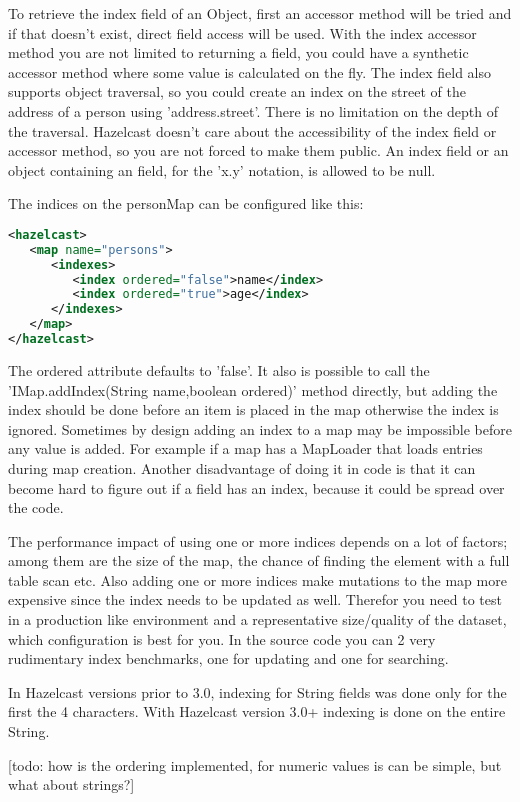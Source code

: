 To retrieve the index field of an Object, first an accessor method will be tried and if that doesn't exist, direct field access will be used. With the index accessor method you are not limited to returning a field, you could have a synthetic accessor method where some value is calculated on the fly. The index field also supports object traversal, so you could create an index on the street of the address of a person using 'address.street'. There is no limitation on the depth of the traversal. Hazelcast doesn't care about the accessibility of the index field or accessor method, so you are not forced to make them public. An index field or an object containing an field, for the 'x.y' notation, is allowed to be null.

The indices on the personMap can be configured like this:
\begin{lstlisting}[language=xml]
<hazelcast>
   <map name="persons">
      <indexes>
         <index ordered="false">name</index>
         <index ordered="true">age</index>
      </indexes>
   </map>
</hazelcast>
\end{lstlisting}
The ordered attribute defaults to 'false'. It also is possible to call the 'IMap.addIndex(String name,boolean ordered)' method directly, but adding the index should be done before an item is placed in the map otherwise the index is ignored. Sometimes by design adding an index to a map may be impossible before any value is added. For example if a map has a MapLoader that loads entries during map creation. Another disadvantage of doing it in code is that it can become hard to figure out if a field has an index, because it could be spread over the code.

The performance impact of using one or more indices depends on a lot of factors; among them are the size of the map, the chance of finding the element with a full table scan etc. Also adding one or more indices make mutations to the map more expensive since the index needs to be updated as well. Therefor you need to test in a production like environment and a representative size/quality of the dataset, which configuration is best for you. In the source code you can 2 very rudimentary index benchmarks, one for updating and one for searching. 

In Hazelcast versions prior to 3.0, indexing for String fields was done only for the first the 4 characters. With Hazelcast version 3.0+ indexing is done on the entire String.

[todo: how is the ordering implemented, for numeric values is can be simple, but what about strings?]

